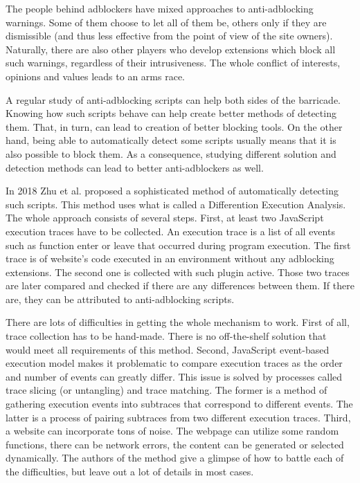 The people behind adblockers have mixed approaches to anti-adblocking warnings.
Some of them choose to let all of them be, others only if they are dismissible (and thus 
less effective from the point of view of the site owners). Naturally, there are also other 
players who develop extensions which block all such warnings, regardless of their
intrusiveness. The whole conflict of interests, opinions and values leads to an arms race.

A regular study of anti-adblocking scripts can help both sides of the barricade. Knowing how such scripts behave
can help create better methods of detecting them. That, in turn, can lead to creation of better blocking tools.
On the other hand, being able to automatically detect some scripts usually means that it is also possible
to block them. As a consequence, studying different solution and detection methods can lead to better anti-adblockers as well.

In 2018 Zhu et al. \cite{DBLP:conf/ndss/ZhuHQSY18} proposed a sophisticated method of automatically detecting such
scripts. This method uses what is called a Differention Execution Analysis. The whole approach consists of several steps.
First, at least two JavaScript execution traces have to be collected. An execution trace is a list of all events such
as function enter or leave that occurred during program execution. The first trace is of website's code executed
in an environment without any adblocking extensions. The second one is collected with such plugin active.
Those two traces are later compared and checked if there are any differences between them.
If there are, they can be attributed to anti-adblocking scripts.

There are lots of difficulties in getting the whole mechanism to work. First of all, trace collection has
to be hand-made. There is no off-the-shelf solution that would meet all requirements of this method.
Second, JavaScript event-based execution model makes it problematic to compare execution traces
as the order and number of events can greatly differ. This issue is solved 
by processes called trace slicing (or untangling) and trace matching. The former is a method of gathering 
execution events into subtraces that correspond to different events. The latter is a process of
pairing subtraces from two different execution traces.
Third, a website can incorporate tons of noise. The webpage can utilize some random functions, 
there can be network errors, the content can be generated or selected dynamically.
The authors of the method give a glimpse of how to battle each of the difficulties, 
but leave out a lot of details in most cases. 

